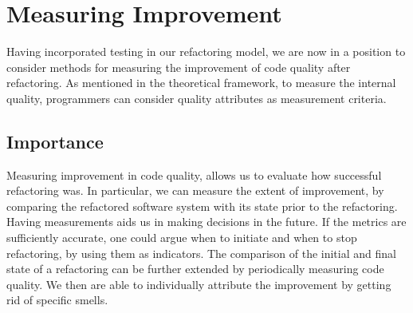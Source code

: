


\section{Measuring Improvement}
Having incorporated testing in our refactoring model, we are now in a position to consider methods for measuring the improvement of code quality after refactoring. As mentioned in the theoretical framework, to measure the internal quality, programmers can consider quality attributes as measurement criteria.

\subsection{Importance}

Measuring improvement in code quality, allows us to evaluate how successful refactoring was. In particular, we can measure the extent of improvement, by comparing the refactored software system with its state prior to the refactoring. Having measurements aids us in making decisions in the future. If the metrics are sufficiently accurate, one could argue when to initiate and when to stop refactoring, by using them as indicators.  The comparison of the initial and final state of a refactoring can be further extended by periodically measuring code quality. We then are able to individually attribute the improvement by getting rid of specific smells. 

